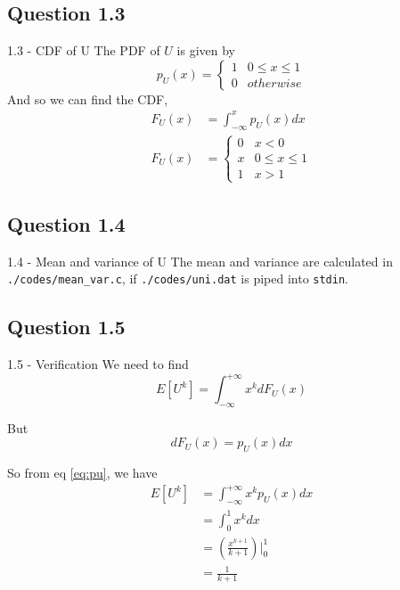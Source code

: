 \documentclass{beamer}
\begin{document}
\subsection{Question 1.3}
\begin{frame}{1.3 - CDF of U}
    The PDF of $U$ is given by
    \begin{equation}
        p_U(x) = 
        \begin{cases}
            1 & 0 \leq x \leq 1 \\
            0 & otherwise
        \end{cases} \label{eq:pu}
    \end{equation}
    And so we can find the CDF,
    \begin{align}
        F_U(x) &= \int_{-\infty}^{x}{p_U(x) dx} \\
        F_U(x) &=
        \begin{cases}
            0 & x < 0 \\
            x & 0 \leq x \leq 1 \\
            1 & x > 1
        \end{cases} \label{eq:fu}
    \end{align}
\end{frame}

\subsection{Question 1.4}
\begin{frame}{1.4 - Mean and variance of U}
    The mean and variance are calculated in \texttt{./codes/mean\_var.c}, if \texttt{./codes/uni.dat} is piped into \texttt{stdin}.
\end{frame}

\subsection{Question 1.5}
\begin{frame}{1.5 - Verification}
    We need to find
    \begin{equation}
        E\left[U^k\right] = \int_{-\infty}^{+\infty}{x^k d F_U(x)}
    \end{equation}

    But
    \begin{equation}
        d F_U(x) = p_U(x) dx
    \end{equation}

    So from eq \eqref{eq:pu}, we have
    \begin{align}
        E\left[U^k\right] &= \int_{-\infty}^{+\infty}{x^k p_U(x) dx} \\
        &= \int_{0}^{1}{x^k dx} \\
        &= \left(\frac{x^{k+1}}{k+1}\right)\Big|_0^1 \\
        &= \frac{1}{k+1} \label{eq:ek}
    \end{align}
\end{frame}
\end{document}
